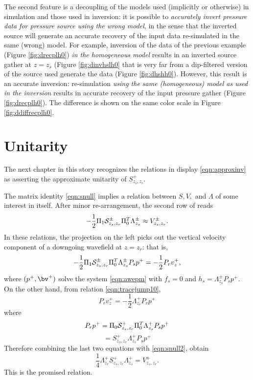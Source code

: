 The second feature is a decoupling of the models used (implicitly or
otherwise) in simulation and those used in inversion: it is possible
to {\em accurately invert pressure data for pressure source using the
  wrong model}, in the sense that the inverted source will
generate an accurate recovery of the input data re-simulated in the
same (wrong) model. For example, inversion of the data of the previous
example (Figure \ref{fig:drecplh0}) {\em in the homogeneous model}
results in an inverted source gather at $z=z_s$ (Figure \ref{fig:dinvhslh0}
that is very far from a dip-filtered version of the source used
generate the data (Figure \ref{fig:dhshh0}). However, this result is an
accurate inversion: re-simulation {\em using the same (homogeneous)
  model as used in the inversion} results in accurate recovery of the
input pressure gather (Figure \ref{fig:drecplh0}). The difference is
shown on the same color scale in Figure \ref{fig:ddiffrecplh0}.

\section{Unitarity}

The next chapter in this story recognizes the relations in display
\ref{eqn:approxinv} as asserting the approximate unitarity of
$S^+_{z_s,z_r}$.

The matrix identity \ref{eqn:snull} implies a relation between $S, V,$
and $\Lambda$ of some interest in itself. After minor re-arrangement, the second row of reads
\begin{equation}
  \label{eqn:snull2}
-\frac{1}{2}\Pi_1{\cal S}^{\pm}_{z_s,z_r}\Pi_0^T\Lambda^{\pm}_{z_s}  \approx
V^{\pm}_{z_s,z_r}.
\end{equation}
In these relations, the projection on the left picks out the vertical velocity component
of a downgoing wavefield at $z=z_r$: that is,
\[
-\frac{1}{2}\Pi_1{\cal S}^{\pm}_{z_s,z_r}\Pi_0^T\Lambda^{\pm}_{z_s}P_sp^+
=-\frac{1}{2}P_r v_z^+,
\]
where $(p^+, \bv^+)$ solve the system \ref{eqn:awepm} with $f_s=0$ and
$h_s = \Lambda^{\pm}_{z_s}P_sp^+$. On the other hand, from relation
\ref{eqn:tracejump10},
\[
  P_r v_z^+ = -\frac{1}{2}\Lambda^+_{z_r}P_r p^+
\]
where
\[
  P_r p^+ = \Pi_0{\cal S}^{+}_{z_s,z_r}\Pi_0^T\Lambda^{+}_{z_s}P_s
  p^+
\]
\[
  = S^+_{z_s,z_r}\Lambda^{+}_{z_s}P_sp^+
\]
Therefore combining the last two equations with \ref{eqn:snull2},
obtain
\begin{equation}
  \label{eqn:sv}
  \frac{1}{4}\Lambda^+_{z_r}S^+_{z_s,z_r}\Lambda^{+}_{z_s} = V^+_{z_s,z_r}.
\end{equation}
This is the promised relation.

